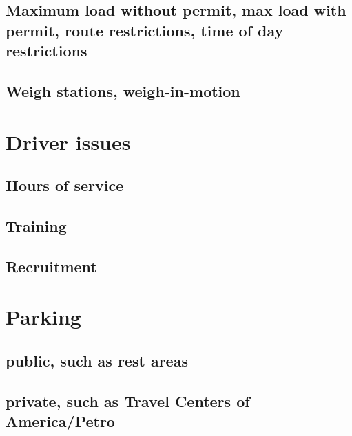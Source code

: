 \documentclass[
]{book}
\begin{document}
\hypertarget{maximum-load-without-permit-max-load-with-permit-route-restrictions-time-of-day-restrictions}{%
\section{Maximum load without permit, max load with permit, route restrictions, time of day restrictions}\label{maximum-load-without-permit-max-load-with-permit-route-restrictions-time-of-day-restrictions}}

\hypertarget{weigh-stations-weigh-in-motion}{%
\section{Weigh stations, weigh-in-motion}\label{weigh-stations-weigh-in-motion}}

\hypertarget{driver-issues}{%
\chapter{Driver issues}\label{driver-issues}}

\hypertarget{hours-of-service}{%
\section{Hours of service}\label{hours-of-service}}

\hypertarget{training}{%
\section{Training}\label{training}}

\hypertarget{recruitment}{%
\section{Recruitment}\label{recruitment}}

\hypertarget{parking}{%
\chapter{Parking}\label{parking}}

\hypertarget{public-such-as-rest-areas}{%
\section{public, such as rest areas}\label{public-such-as-rest-areas}}

\hypertarget{private-such-as-travel-centers-of-americapetro}{%
\section{private, such as Travel Centers of America/Petro}\label{private-such-as-travel-centers-of-americapetro}}
\end{document}
